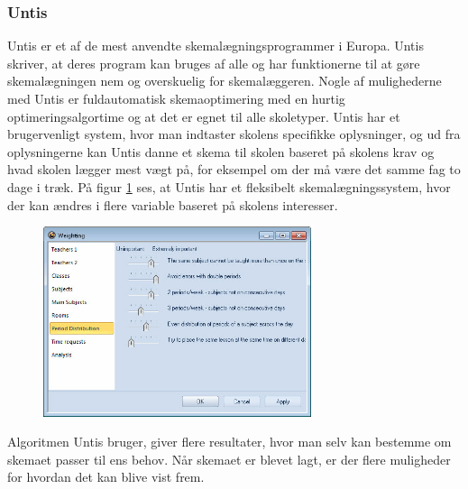 \subsubsection{Untis}
Untis er et af de mest anvendte skemalægningsprogrammer i Europa. Untis skriver, at deres program kan bruges af alle og har funktionerne til at gøre skemalægningen nem og overskuelig for skemalæggeren. Nogle af mulighederne med Untis er fuldautomatisk skemaoptimering med en hurtig optimeringsalgortime og at det er egnet til alle skoletyper.\cite{UntisDK}
Untis har et brugervenligt system, hvor man indtaster skolens specifikke oplysninger, og ud fra oplysningerne kan Untis danne et skema til skolen baseret på skolens krav og hvad skolen lægger mest vægt på, for eksempel om der må være det samme fag to dage i træk. På figur \ref{fig:untisskema} ses, at Untis har et fleksibelt skemalægningssystem, hvor der kan ændres i flere variable baseret på skolens interesser. 
\begin{figure}[h!]
	\centering
	\includegraphics[width=0.7\textwidth]{../Billeder/untisskema.jpg}
	\label{fig:untisskema}
\end{figure}
\FloatBarrier
Algoritmen Untis bruger, giver flere resultater, hvor man selv kan bestemme om skemaet passer til ens behov. Når skemaet er blevet lagt, er der flere muligheder for hvordan det kan blive vist frem.\cite{UntisInt}


